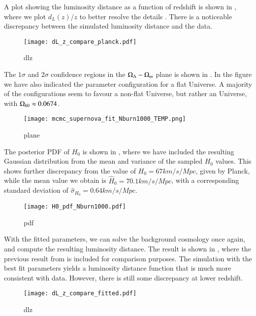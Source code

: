A plot showing the luminosity distance as a function of redshift is shown in , where we plot $d_L(z)/z$ to better resolve the details . There is a noticeable discrepancy between the simulated luminosity distance and the data.      
\begin{figure}[ht!]
    \texttt{[image: dL\_z\_compare\_planck.pdf]}
    \caption{dlz}
    \label{fig:M1:dL_of_z_data_vs_Planck}
\end{figure}

The $1\sigma$ and $2\sigma$ confidence regions in the $\Omega_{\Lambda}-\Omega_{m}$ plane is shown in . In the figure we have also indicated the parameter configuration for a flat Universe. A majority of the configurations seem to favour a non-flat Universe, but rather an  Universe, with $\Omega_{k0}\approx 0.0674$.     
\begin{figure}[ht!]
    \texttt{[image: mcmc\_supernova\_fit\_Nburn1000\_TEMP.png]}
    \caption{plane}
    \label{fig:M1:oM_oL_plane}
\end{figure}

The posterior PDF of $H_0$ is shown in , where we have included the resulting Gaussian distribution from the mean and variance of the sampled $H_0$ values. This shows further discrepancy from the value of $H_0=67\unit{km/s/Mpc}$, given by Planck, while the mean value we obtain is $\hat{H}_0=70.1\unit{km/s/Mpc}$, with a corresponding standard deviation of $\hat{\sigma}_{H_0}=0.64\unit{km/s/Mpc}$.       
\begin{figure}[ht!]
    \texttt{[image: H0\_pdf\_Nburn1000.pdf]}    
    \caption{pdf}
    \label{fig:M1:H0_posterior_pdf}
\end{figure}


With the fitted parameters, we can solve the background cosmology once again, and compute the resulting luminosity distance. The result is shown in , where the previous result from  is included for comparison purposes. The simulation with the best fit parameters yields a luminosity distance function that is much more consistent with data. However, there is still some discrepancy at lower redshift.    
\begin{figure}[ht!]
    \texttt{[image: dL\_z\_compare\_fitted.pdf]}
    \caption{dlz}
    \label{fig:M1:dL_of_z_data_vs_bestfit}
\end{figure}

